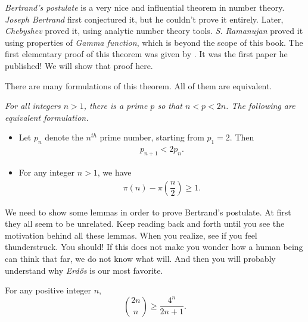 \documentclass{subfile}
\begin{document}
	\label{sec:bertrandspostulate}
	\textit{Bertrand's postulate} is a very nice and influential theorem in number theory. \textit{Joseph Bertrand} first conjectured it, but he couldn't prove it entirely. Later, \textit{Chebyshev} proved it, using analytic number theory tools. \textit{S. Ramanujan} \textcite{meher_murty_2013} proved it using properties of \textit{Gamma function}, which is beyond the scope of this book. The first elementary proof of this theorem was given by \textcite{erdos_1932}. It was the first paper he published! We will show that proof here.

	There are many formulations of this theorem. All of them are equivalent.

	\begin{theorem}\label{thm:bertrand}\slshape
		For all integers $n>1$, there is a prime $p$ so that $n<p<2n$. The following are equivalent formulation.
		\begin{itemize}
			\item Let $p_n$ denote the $n^{th}$ prime number, starting from $p_1=2$. Then
			\begin{eqnarray*}
				p_{n+1} <2p_n.
			\end{eqnarray*}
			\item For any integer $n >1$, we have
			\begin{eqnarray*}
				\pi(n)-\pi\left(\dfrac{n}{2}\right)\geq1.
			\end{eqnarray*}
		\end{itemize}
	\end{theorem}

	We need to show some lemmas in order to prove Bertrand's postulate. At first they all seem to be unrelated. Keep reading back and forth until you see the motivation behind all these lemmas. When you realize, see if you feel thunderstruck. You should! If this does not make you wonder how a human being can think that far, we do not know what will. And then you will probably understand why \textit{Erd\H {o}s} is our most favorite.

	\begin{lemma}\label{lem:bertrand1}
		For any positive integer $n$,
		\[\binom{2n}{n}\geq\dfrac{4^n}{2n+1}.\]
	\end{lemma}
\end{document}
